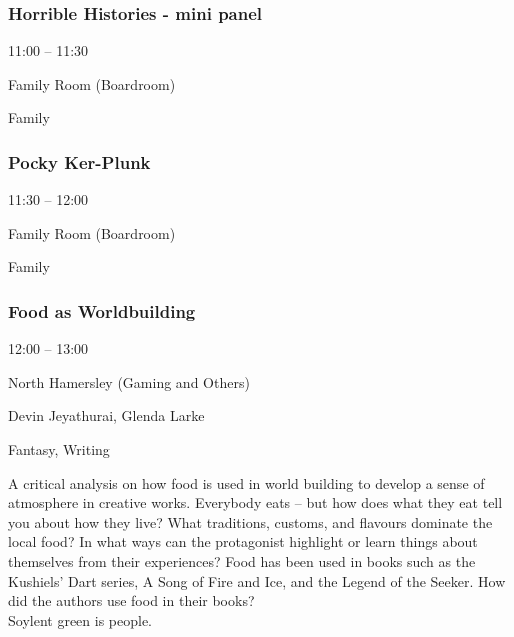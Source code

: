 \documentclass{scrreprt}
\begin{document}
\begin{multicols}{2}
\subsubsection*{Horrible Histories - mini panel}\begin{description}
\setlength{\itemsep}{0pt}
\setlength{\parsep}{0pt}
\setlength{\parskip}{0pt}
\item[Time:]{11:00 -- 11:30}
\item[Venue:]{Family Room (Boardroom)}
\item[Tags:]{Family}\end{description}

\subsubsection*{Pocky Ker-Plunk}\begin{description}
\setlength{\itemsep}{0pt}
\setlength{\parsep}{0pt}
\setlength{\parskip}{0pt}
\item[Time:]{11:30 -- 12:00}
\item[Venue:]{Family Room (Boardroom)}
\item[Tags:]{Family}\end{description}

\subsubsection*{Food as Worldbuilding}\begin{description}
\setlength{\itemsep}{0pt}
\setlength{\parsep}{0pt}
\setlength{\parskip}{0pt}
\item[Time:]{12:00 -- 13:00}
\item[Venue:]{North Hamersley (Gaming and Others)}
\item[People:]{Devin Jeyathurai, Glenda Larke}
\item[Tags:]{Fantasy, Writing}\end{description}
A critical analysis on how food is used in world building to develop a sense of atmosphere in creative works. Everybody eats – but how does what they eat tell you about how they live? What traditions, customs, and flavours dominate the local food? In what ways can the protagonist highlight or learn things about themselves from their experiences? Food has been used in books such as the Kushiels’ Dart series, A Song of Fire and Ice, and the Legend of the Seeker. How did the authors use food in their books?\\Soylent green is people.

\end{multicols}
\end{document}
